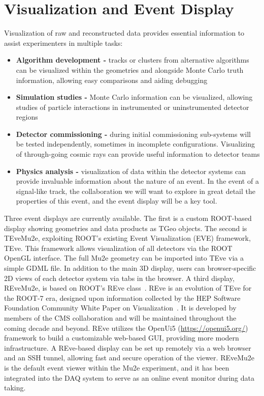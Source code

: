 \section{Visualization and Event Display}
\label{sec:display}

Visualization of raw and reconstructed data provides essential information to assist experimenters in multiple tasks:

\begin{itemize}
    \item \textbf{Algorithm development -} tracks or clusters from alternative algorithms can be visualized within the geometries and alongside Monte Carlo truth information, allowing easy comparisons and aiding debugging
    \item \textbf{Simulation studies -} Monte Carlo information can be visualized, allowing studies of particle interactions in instrumented or uninstrumented detector regions
    \item \textbf{Detector commissioning -} during initial commissioning sub-systems will be tested independently, sometimes in incomplete configurations. Visualizing of through-going cosmic rays can provide useful information to detector teams
    \item \textbf{Physics analysis -} visualization of data within the detector systems can provide invaluable information about the nature of an event. In the event of a signal-like track, the collaboration we will want to explore in great detail the properties of this event, and the event display will be a key tool.
\end{itemize}

Three event displays are currently available. The first is a custom ROOT-based display showing geometries and data products as TGeo objects. The second is TEveMu2e, exploiting ROOT's existing Event Visualization (EVE) framework, TEve. This framework allows visualization of all detectors via the ROOT OpenGL interface. The full Mu2e geometry can be imported into TEve via a simple GDML file. In addition to the main 3D display, users can browser-specific 2D views of each detector system via tabs in the browser. A third display, REveMu2e, is based on ROOT's REve class~\cite{Tadel:2020hlt}. REve is an evolution of TEve for the ROOT-7 era, designed upon information collected by the HEP Software Foundation Community White Paper on Visualization~\cite{Bellis:2018hej}. It is developed by members of the CMS collaboration and will be maintained throughout the coming decade and beyond. REve utilizes the OpenUi5 (\url{https://openui5.org/}) framework to build a customizable web-based GUI, providing more modern infrastructure. A REve-based display can be set up remotely via a web browser and an SSH tunnel, allowing fast and secure operation of the viewer. REveMu2e is the default event viewer within the Mu2e experiment, and it has been integrated into the DAQ system to serve as an online event monitor during data taking.


